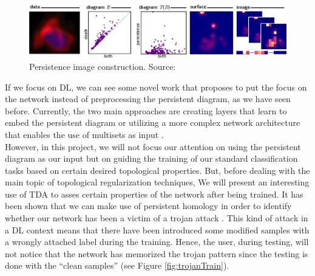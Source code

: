 \documentclass[../main.tex]{subfiles}
\begin{document}
\begin{itemize}
    \begin{figure}[!ht]
        \centering
        \includegraphics[width=\textwidth]{figures/bg/persImage.png} 
        \caption{Persistence image construction. Source: \cite{adams_persistence_2016}}
        \label{fig:persImages}
    \end{figure}
    
\end{itemize}

If we focus on DL, we can see some novel work that proposes to put the focus on the network instead of preprocessing the persistent diagram, as we have seen before. Currently, the two main approaches are creating layers that learn to embed the persistent diagram or utilizing a more complex network architecture that enables the use of multisets as input \cite{hensel_survey_2021}.\\

However, in this project, we will not focus our attention on using the persistent diagram as our input but on guiding the training of our standard classification tasks based on certain desired topological properties. But, before dealing with the main topic of topological regularization techniques, We will present an interesting use of TDA to asses certain properties of the network after being trained. It has been shown that we can make use of persistent homology in order to identify whether our network has been a victim of a trojan attack \cite{zheng_topological_2022}. This kind of attack in a DL context means that there have been introduced some modified samples with a wrongly attached label during the training. Hence, the user, during testing, will not notice that the network has memorized the trojan pattern since the testing is done with the ``clean samples'' (see Figure \ref{fig:trojanTrain}).
\end{document}
